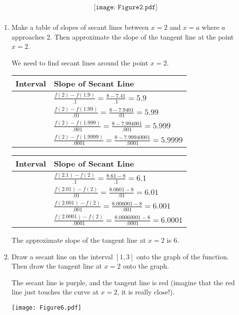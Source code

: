 \documentclass[nooutcomes]{ximera}
\begin{document}
\begin{problem}
\begin{problem}
\[\begin{array}{lr}
& 

\texttt{[image: Figure2.pdf]} 

\\

\end{array} \]
	
		\begin{enumerate}
			
		\item  Make a table of slopes of secant lines between $x=2$ and $x=a$ where $a$ approaches 2.  Then approximate the slope of the tangent line at the point $x=2$.
		\begin{freeResponse}		 
		We need to find secant lines around the point $x=2$.
		
			\begin{tabular}{|l|l|}
			\hline
			Interval & Slope of Secant Line  \\
			\hline
			[1.9,2] & $ \frac{f(2)-f(1.9)}{.1}=\frac{8-7.41}{.1}=5.9$  \\
			\hline
			[1.99,2] & $\frac{f(2)-f(1.99)}{.01}=\frac{8-7.9401}{.01}=5.99$  \\
			\hline
			[1.999,2] & $\frac{f(2)-f(1.999)}{.001}=\frac{8-7.994001}{.001}=5.999$  \\
			\hline
			[1.9999,2] & $\frac{f(2)-f(1.9999)}{.0001}=\frac{8-7.99940001}{.0001}=5.9999$  \\
			\hline
			\end{tabular}
			
			\begin{tabular}{|l|l|}
			\hline
			Interval & Slope of Secant Line  \\
			\hline
			[2,2.1] & $ \frac{f(2.1)-f(2)}{.1}=\frac{8.61-8}{.1}=6.1$  \\
			\hline
			[2,2.01] & $\frac{f(2.01)-f(2)}{.01}=\frac{8.0601-8}{.01}=6.01$  \\
			\hline
			[2,2.001] & $\frac{f(2.001)-f(2)}{.001}=\frac{8.006001-8}{.001}=6.001$  \\
			\hline
			[2,2.0001] & $\frac{f(2.0001)-f(2)}{.0001}=\frac{8.00060001-8}{.0001}=6.0001$  \\
			\hline
			\end{tabular}
			
		The approximate slope of the tangent line at $x=2$ is 6.
		\end{freeResponse}
			  
		\item  Draw a secant line on the interval $[1,3]$ onto the graph of the function.  Then draw the tangent line at $x=2$ onto the graph. 
		\begin{freeResponse}		 
		The secant line is purple, and the tangent line is red (imagine that the red line just touches the curve at $x=2$, it is really close!).
			\begin{image}
			\texttt{[image: Figure6.pdf]}
			\end{image}
		\end{freeResponse}
				

\end{enumerate}
\end{problem}
\end{problem}
\end{document}
